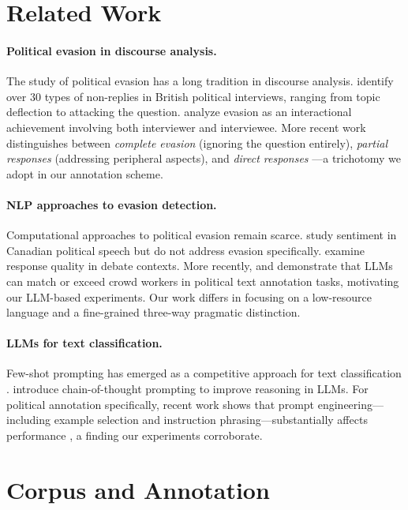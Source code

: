 \documentclass[11pt]{article}
\begin{document}
\section{Related Work}

\paragraph{Political evasion in discourse analysis.}
The study of political evasion has a long tradition in discourse analysis. \citet{bull1994politician} identify over 30 types of non-replies in British political interviews, ranging from topic deflection to attacking the question. \citet{clayman2001answers} analyze evasion as an interactional achievement involving both interviewer and interviewee. More recent work distinguishes between \textit{complete evasion} (ignoring the question entirely), \textit{partial responses} (addressing peripheral aspects), and \textit{direct responses} \cite{rasiah2010taxonomic}---a trichotomy we adopt in our annotation scheme.

\paragraph{NLP approaches to evasion detection.}
Computational approaches to political evasion remain scarce. \citet{kenyon2018sentiment} study sentiment in Canadian political speech but do not address evasion specifically. \citet{louis2018argument} examine response quality in debate contexts. More recently, \citet{gilardi2023chatgpt} and \citet{tornberg2023chatgpt} demonstrate that LLMs can match or exceed crowd workers in political text annotation tasks, motivating our LLM-based experiments. Our work differs in focusing on a low-resource language and a fine-grained three-way pragmatic distinction.

\paragraph{LLMs for text classification.}
Few-shot prompting has emerged as a competitive approach for text classification \cite{brown2020language}. \citet{wei2022chain} introduce chain-of-thought prompting to improve reasoning in LLMs. For political annotation specifically, recent work shows that prompt engineering---including example selection and instruction phrasing---substantially affects performance \cite{gilardi2023chatgpt}, a finding our experiments corroborate.

\section{Corpus and Annotation}
\end{document}
